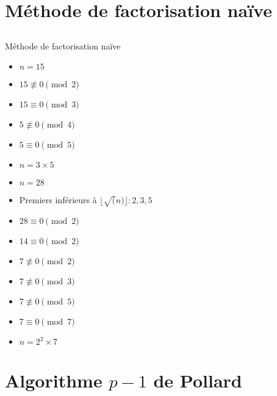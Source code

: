 \documentclass[utf8,10pt,french]{beamer}
\begin{document}
\section{Méthode de factorisation naïve}
\subsection{}
\begin{frame}{Méthode de factorisation naïve}
\begin{example}
\begin{itemize}    
\item $n = 15$ 
\item $15 \not\equiv 0 \pmod 2$
\item $15 \equiv 0 \pmod 3$ 
\item $5 \not\equiv 0 \pmod 4$ 
\item $5 \equiv 0 \pmod 5$
\item $n = 3 \times 5$
\end{itemize}
\end{example}
\end{frame}

\begin{frame}
\begin{example}
\begin{itemize}
\item $n = 28$    
\item Premiers inférieurs à $\lfloor\sqrt(n)\rfloor : 2, 3, 5$
\item $28 \equiv 0 \pmod 2$
\item $14 \equiv 0 \pmod 2$
\item $7 \not\equiv 0 \pmod 2$
\item $7 \not\equiv 0 \pmod 3$
\item $7 \not\equiv 0 \pmod 5$
\item $7 \equiv 0 \pmod 7$
\item $n = 2^2 \times 7$
\end{itemize}
\end{example}
\end{frame}

\section{Algorithme $p - 1$ de Pollard}
\end{document}
